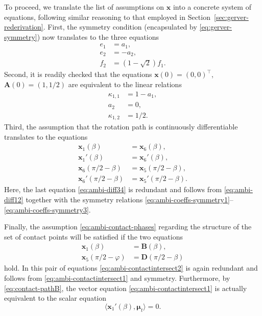 \documentclass[11pt]{article}
\newcommand{\nvecone}{\boldsymbol{\mu}}
\begin{document}
To proceed, we translate the list of assumptions on $\mathbf{x}$ into a concrete system of equations, following similar reasoning to that employed in Section~\ref{sec:gerver-rederivation}. First, the symmetry condition (encapsulated by \eqref{eq:gerver-symmetry}) now translates to the three equations
\begin{align}
e_1 &= a_1, \label{eq:ambi-coeffs-symmetry1} \\
e_2 &= -a_2, \label{eq:ambi-coeffs-symmetry2} \\
f_2 &= (1-\sqrt{2})f_1. \label{eq:ambi-coeffs-symmetry3}
\end{align}
Second, it is readily checked that the equations $\mathbf{x}(0)=(0,0)^\top$, $\mathbf{A}(0)=(1,1/2)$ are equivalent to the linear relations
\begin{align}
\kappa_{1,1}&=1-a_1, \label{eq:ambi-xA-relations1} \\
a_2 &= 0, \label{eq:ambi-xA-relations2}
\\
\kappa_{1,2} &= 1/2. \label{eq:ambi-xA-relations3}
\end{align}
Third, the assumption that the rotation path is continuously differentiable translates to the equations
\begin{align}
\mathbf{x}_1(\beta) &= \mathbf{x}_6(\beta), \label{eq:ambi-cont12} \\
\mathbf{x}_1'(\beta) &= \mathbf{x}_6'(\beta), \label{eq:ambi-diff12} \\
\mathbf{x}_6(\pi/2-\beta) &= \mathbf{x}_5(\pi/2-\beta), \label{eq:ambi-cont34} \\
\mathbf{x}_6'(\pi/2-\beta) &= \mathbf{x}_5'(\pi/2-\beta). \label{eq:ambi-diff34} 
\end{align}
Here, the last equation \eqref{eq:ambi-diff34} is redundant and follows from \eqref{eq:ambi-diff12} together with the symmetry relations \eqref{eq:ambi-coeffs-symmetry1}--\eqref{eq:ambi-coeffs-symmetry3}.

Finally, the assumption \eqref{eq:ambi-contact-phases} regarding the structure of the set of contact points will be satisfied if the two equations
\begin{align}
\mathbf{x}_1(\beta) &= \mathbf{B}(\beta), \label{eq:ambi-contactintersect1} \\
\mathbf{x}_5(\pi/2-\varphi) &= \mathbf{D}(\pi/2-\beta) \label{eq:ambi-contactintersect2}
\end{align}
hold. In this pair of equations \eqref{eq:ambi-contactintersect2} is again redundant and follows from \eqref{eq:ambi-contactintersect1} and symmetry. Furthermore, by \eqref{eq:contact-pathB}, the vector equation \eqref{eq:ambi-contactintersect1} is actually equivalent to the scalar equation
\begin{equation}
\big\langle \mathbf{x}_1'(\beta), \nvecone_t \big\rangle = 0. \label{eq:ambi-contactintersect3}
\end{equation}
\end{document}
